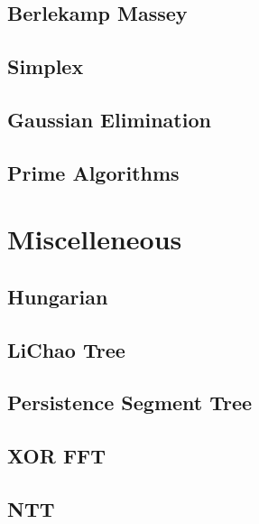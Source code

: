 \documentclass[10pt,landscape,a4paper,twocolumn]{article}
\begin{document}
\subsection{Berlekamp Massey}


\subsection{Simplex}


\subsection{Gaussian Elimination}


\subsection{Prime Algorithms}



\section{Miscelleneous}

\subsection{Hungarian}


\subsection{LiChao Tree}


\subsection{Persistence Segment Tree}


\subsection{XOR FFT}


\subsection{NTT}

\end{document}
